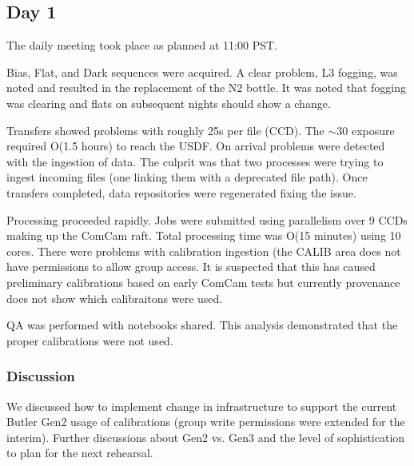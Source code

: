 \subsection{Day 1} \label{sec:day1}

The daily meeting took place as planned at 11:00 PST.

Bias, Flat, and Dark sequences were acquired.  A clear problem, L3 fogging, was 
noted and resulted in the replacement of the N2 bottle.  It was noted that 
fogging was clearing and flats on subsequent nights should show a change.  

Transfers showed problems with roughly 25s per file (CCD).  The $\sim$30 exposure 
required O(1.5 hours) to reach the USDF.  On arrival problems were detected with
the ingestion of data.  The culprit was that two processes were trying to ingest 
incoming files (one linking them with a deprecated file path).  Once transfers 
completed, data repositories were regenerated fixing the issue.  

Processing proceeded rapidly.  Jobs were submitted using parallelism over 9 CCDs
making up the ComCam raft.  Total processing time was O(15 minutes) using 10 cores.
There were problems with calibration ingestion (the CALIB area does not have 
permissions to allow group access.  It is suspected that this has caused preliminary 
calibrations based on early ComCam tests but currently provenance does not show
which calibraitons were used.

QA was performed with notebooks shared.  This analysis demonstrated that the 
proper calibrations were not used.  

\subsubsection{Discussion}
We discussed how to implement change in infrastructure to support the current
Butler Gen2 usage of calibrations (group write permissions were extended for the
interim).  Further discussions about Gen2 vs. Gen3 and the level of sophistication
to plan for the next rehearsal.  

